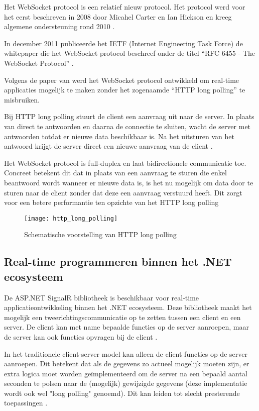Het WebSocket protocol is een relatief nieuw protocol. Het protocol werd voor het eerst beschreven in 2008 door Micahel Carter en Ian Hickson en kreeg algemene ondersteuning rond 2010 \autocite{Ably2020}.

In december 2011 publiceerde het IETF (Internet Engineering Task Force) de whitepaper die het WebSocket protocol beschreef onder de titel ``RFC 6455 - The WebSocket Protocol'' \autocite{Fette2011}.

Volgens de paper van \textcite{Fette2011} werd het WebSocket protocol ontwikkeld om real-time applicaties mogelijk te maken zonder het zogenaamde ``HTTP long polling'' te misbruiken.

Bij HTTP long polling stuurt de client een aanvraag uit naar de server. In plaats van direct te antwoorden en daarna de connectie te sluiten, wacht de server met antwoorden totdat er nieuwe data beschikbaar is. Na het uitsturen van het antwoord krijgt de server direct een nieuwe aanvraag van de client \autocite{Singh}. 

Het WebSocket protocol is full-duplex en laat bidirectionele communicatie toe. Concreet betekent dit dat in plaats van een aanvraag te sturen die enkel beantwoord wordt wanneer er nieuwe data is, is het nu mogelijk om data door te sturen naar de client zonder dat deze een aanvraag verstuurd heeft. Dit zorgt voor een betere performantie ten opzichte van het HTTP long polling \autocite{Fette2011}

\begin{figure}[H]
    \texttt{[image: http\_long\_polling]}
    \centering
    \caption{Schematische voorstelling van HTTP long polling}
    \label{fig:httpLongPolling}
\end{figure}

\subsection{Real-time programmeren binnen het .NET ecosysteem}
De ASP.NET SignalR bibliotheek is beschikbaar voor real-time applicatieontwikkeling binnen het .NET ecosysteem. Deze bibliotheek maakt het mogelijk een tweerichtingscommunicatie op te zetten tussen een client en een server. De client kan met name bepaalde functies op de server aanroepen, maar de server kan ook functies opvragen bij de client \autocite{BradyGaster2020}.

In het traditionele client-server model kan alleen de client functies op de server aanroepen. Dit betekent dat als de gegevens zo actueel mogelijk moeten zijn, er extra logica moet worden geïmplementeerd om de server na een bepaald aantal seconden te polsen naar de (mogelijk) gewijzigde gegevens (deze implementatie wordt ook wel "long polling" genoemd). Dit kan leiden tot slecht presterende toepassingen \autocite{BradyGaster2020}.

